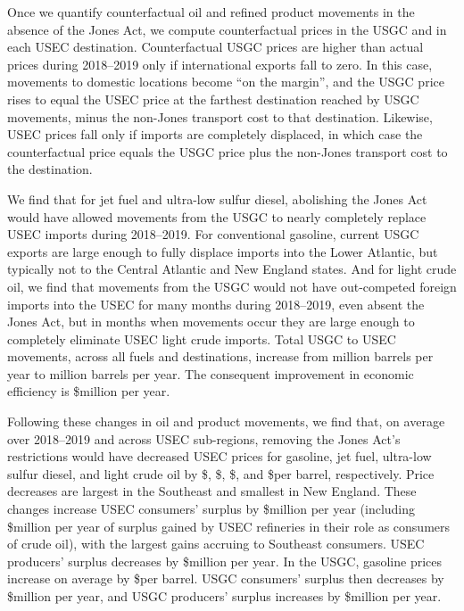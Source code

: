 \documentclass[12pt]{article}
\begin{document}
Once we quantify counterfactual oil and refined product movements in the absence of the Jones Act, we compute counterfactual prices in the USGC and in each USEC destination. Counterfactual USGC prices are higher than actual prices during 2018--2019 only if international exports fall to zero. In this case, movements to domestic locations become ``on the margin'', and the USGC price rises to equal the USEC price at the farthest destination reached by USGC movements, minus the non-Jones transport cost to that destination. Likewise, USEC prices fall only if imports are completely displaced, in which case the counterfactual price equals the USGC price plus the non-Jones transport cost to the destination.

We find that for jet fuel and ultra-low sulfur diesel, abolishing the Jones Act would have allowed movements from the USGC to nearly completely replace USEC imports during 2018--2019. For conventional gasoline, current USGC exports are large enough to fully displace imports into the Lower Atlantic, but typically not to the Central Atlantic and New England states. And for light crude oil, we find that movements from the USGC would not have out-competed foreign imports into the USEC for many months during 2018--2019, even absent the Jones Act, but in months when movements occur they are large enough to completely eliminate USEC light crude imports. Total USGC to USEC movements, across all fuels and destinations, increase from million barrels per year to million barrels per year. The consequent improvement in economic efficiency is  \$million per year.

Following these changes in oil and product movements, we find that, on average over 2018--2019 and across USEC sub-regions, removing the Jones Act's restrictions would have decreased USEC prices for gasoline, jet fuel, ultra-low sulfur diesel, and light crude oil by \$\unskip, \$\unskip, \$\unskip, and \$per barrel, respectively. Price decreases are largest in the Southeast and smallest in New England. These changes increase USEC consumers' surplus by \$million per year (including \$million per year of surplus gained by USEC refineries in their role as consumers of crude oil), with the largest gains accruing to Southeast consumers. USEC producers' surplus decreases by \$million per year. In the USGC, gasoline prices increase on average by \$per barrel. USGC consumers' surplus then decreases by \$million per year, and USGC producers' surplus increases by \$million per year.
\end{document}

